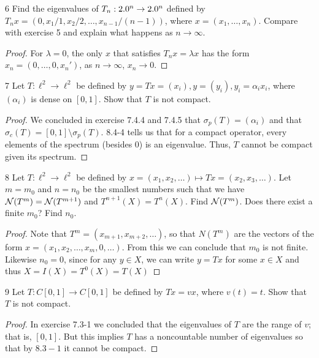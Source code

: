 \begin{exercise}{6}
Find the eigenvalues of $T_n: 2.0^n \to 2.0^n$ defined by $T_n x = (0, x_1 / 1, x_2 / 2, \dots, x_{n-1} / (n-1))$, where $x = (x_1, \dots, x_n)$.
Compare with exercise 5 and explain what happens as $n \to \infty$.
\end{exercise}
\begin{proof}
For $\lambda = 0$, the only $x$ that satisfies $T_n x = \lambda x$ has the form $x_n = (0, \dots, 0, x_n')$, as $n \to \infty$, $x_n \to 0$.
\end{proof} 

\begin{exercise}{7}
Let $T: \ell^2 \to \ell^2$ be defined by $y = T x = (x_i), y = (y_i), y_i = \alpha_i x_i$, where $(\alpha_i)$ is dense on $[0, 1]$.
Show that $T$ is not compact.
\end{exercise}
\begin{proof}
We concluded in exercise 7.4.4 and 7.4.5 that $\sigma_p(T) = (\alpha_i)$ and that $\sigma_c(T) = [0, 1] \setminus \sigma_p(T)$.
8.4-4 tells us that for a compact operator, every elements of the spectrum (besides 0) is an eigenvalue.
Thus, $T$ cannot be compact given its spectrum.
\end{proof} 

\begin{exercise}{8}
Let $T: \ell^2 \to \ell^2$ be defined by $x = (x_1, x_2, \dots) \mapsto T x = (x_2, x_3, \dots)$.
Let $m = m_0$ and $n = n_0$ be the smallest numbers such that we have $\mathcal{N}(T^m) = \mathcal{N}(T^{m+1})$ and $T^{n+1}(X) = T^n (X)$.
Find $\mathcal{N}(T^m)$.
Does there exist a finite $m_0$?
Find $n_0$.
\end{exercise}
\begin{proof}
Note that $T^m = (x_{m+1}, x_{m+2}, \dots)$, so that $N(T^m)$ are the vectors of the form $x = (x_1, x_2, \dots, x_m, 0, \dots)$.
From this we can conclude that $m_0$ is not finite.
Likewise $n_0 = 0$, since for any $y \in X$, we can write $y = Tx$ for some $x \in X$ and thus $X = I(X) = T^0(X) = T(X)$
\end{proof} 

\begin{exercise}{9}
Let $T: C[0, 1] \to C[0, 1]$ be defined by $T x = v x$, where $v(t) = t$.
Show that $T$ is not compact.
\end{exercise}
\begin{proof}
In exercise 7.3-1 we concluded that the eigenvalues of $T$ are the range of $v$;
that is, $[0, 1]$.
But this implies $T$ has a noncountable number of eigenvalues so that by $8.3-1$ it cannot be compact.
\end{proof} 


